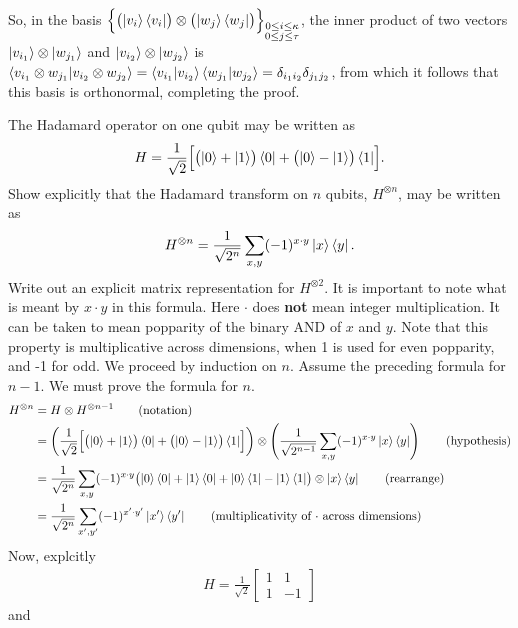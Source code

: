 So, in the basis $\Bigl\{\bigl(\ket{v_i}\bra{v_i}\bigr)\otimes\bigl(\ket{w_j}\bra{w_j}\bigr)\Bigr\}_{\substack{0\leq i\leq \kappa\\0\leq j\leq \tau}}$, the inner product of two vectors $\ket{v_{i_1}}\otimes\ket{w_{j_1}}$ and $\ket{v_{i_2}}\otimes\ket{w_{j_2}}$ is $\braket{v_{i_1}\otimes w_{j_1} | v_{i_2}\otimes w_{j_2}} = \braket{v_{i_1}|v_{i_2}}\braket{w_{j_1}|w_{j_2}}=\delta_{i_1i_2}\delta_{j_1j_2}$, from which it follows that this basis is orthonormal, completing the proof.

 The Hadamard operator on one qubit may be written as $$H=\frac{1}{\sqrt{2}}\Bigl[\bigl(\ket{0}+\ket{1}\bigr)\bra{0}+\bigl(\ket{0}-\ket{1}\bigr)\bra{1}\Bigr].$$  Show explicitly that the Hadamard transform on $n$ qubits, $H^{\otimes n}$, may be written as $$H^{\otimes n} = \frac{1}{\sqrt{2^n}}\sum_{x,y}(-1)^{x\cdot y}\ket{x}\bra{y}.$$ Write out an explicit matrix representation for $H^{\otimes 2}$.
\Soln It is important to note what is meant by $x\cdot y$ in this formula.  Here $\cdot$ does \textbf{not} mean integer multiplication.  It can be taken to mean popparity of the binary AND of $x$ and $y$. Note that this property is multiplicative across dimensions, when 1 is used for even popparity, and -1 for odd.  We proceed by induction on $n$.  Assume the preceding formula for $n-1$.  We must prove the formula for $n$.
\begin{align*}
H^{\otimes n} &= H\otimes H^{\otimes n-1}\tag{notation} \\
&=\left(\frac{1}{\sqrt{2}}\Bigl[\bigl(\ket{0}+\ket{1}\bigr)\bra{0}+\bigl(\ket{0}-\ket{1}\bigr)\bra{1}\Bigr]\right) \otimes\left(\frac{1}{\sqrt{2^{n-1}}}\sum_{x,y}(-1)^{x\cdot y}\ket{x}\bra{y}\right)\tag{hypothesis} \\
&=\frac{1}{\sqrt{2^n}}\sum_{x,y}(-1)^{x\cdot y}\bigl(\ket{0}\bra{0}+\ket{1}\bra{0}+\ket{0}\bra{1}-\ket{1}\bra{1}\bigr) \otimes \ket{x}\bra{y}\tag{rearrange} \\
&=\frac{1}{\sqrt{2^n}}\sum_{x',y'}(-1)^{x'\cdot y'}\ket{x'}\bra{y'} \tag{multiplicativity of $\cdot$ across dimensions}
\end{align*}
Now, explcitly  
\begin{align*}
	H  = \frac{1}{\sqrt{2}} \begin{bmatrix}
		1 & 1 \\
		1 & -1
	\end{bmatrix}
\end{align*}
and
